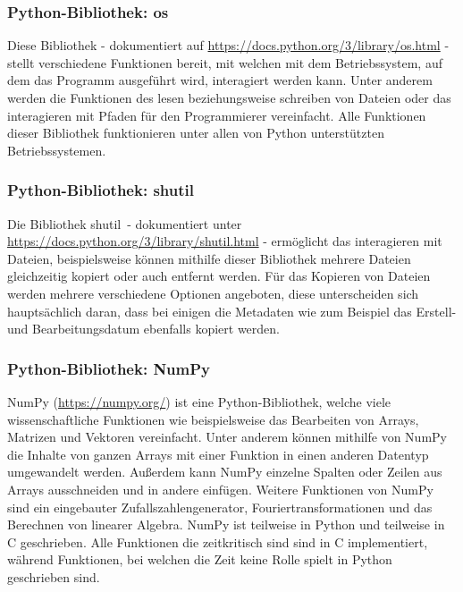 \subsubsection{Python-Bibliothek: os}
\label{subsubsec:tLibOs}
Diese Bibliothek - dokumentiert auf \url{https://docs.python.org/3/library/os.html} - stellt verschiedene Funktionen bereit, mit welchen mit dem Betriebssystem, auf dem das Programm ausgeführt wird, interagiert werden kann. Unter anderem werden die Funktionen des lesen beziehungsweise schreiben von Dateien oder das interagieren mit Pfaden für den Programmierer vereinfacht. Alle Funktionen dieser Bibliothek funktionieren unter allen von Python unterstützten Betriebssystemen.

\subsubsection{Python-Bibliothek: shutil}
\label{subsubsec:tShutil}
Die Bibliothek \glqq shutil\grqq\ - dokumentiert unter \url{https://docs.python.org/3/library/shutil.html} - ermöglicht das interagieren mit Dateien, beispielsweise können mithilfe dieser Bibliothek mehrere Dateien gleichzeitig kopiert oder auch entfernt werden. Für das Kopieren von Dateien werden mehrere verschiedene Optionen angeboten, diese unterscheiden sich hauptsächlich daran, dass bei einigen die Metadaten wie zum Beispiel das Erstell- und Bearbeitungsdatum ebenfalls kopiert werden.

\subsubsection{Python-Bibliothek: NumPy}
\label{subsubsec:tNumpy}
NumPy (\url{https://numpy.org/}) ist eine Python-Bibliothek, welche viele wissenschaftliche Funktionen wie beispielsweise das Bearbeiten von Arrays, Matrizen und Vektoren vereinfacht. Unter anderem können mithilfe von NumPy die Inhalte von ganzen Arrays mit einer Funktion in einen anderen Datentyp umgewandelt werden. Außerdem kann NumPy einzelne Spalten oder Zeilen aus Arrays ausschneiden und in andere einfügen. Weitere Funktionen von NumPy sind ein eingebauter Zufallszahlengenerator, Fouriertransformationen und das Berechnen von linearer Algebra. NumPy ist teilweise in Python und teilweise in C geschrieben. Alle Funktionen die zeitkritisch sind sind in C implementiert, während Funktionen, bei welchen die Zeit keine Rolle spielt in Python geschrieben sind.

